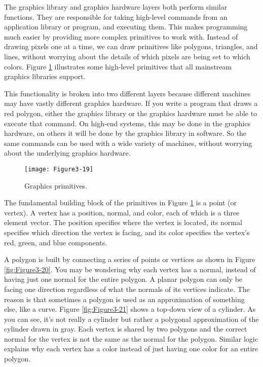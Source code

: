 The graphics library and graphics hardware layers both perform similar functions. They are responsible for taking high-level commands from an application library or program, and executing them. This makes programming much easier by providing more complex primitives to work with. Instead of drawing pixels one at a time, we can draw primitives like polygons, triangles, and lines, without worrying about the details of which pixels are being set to which colors. Figure \ref{fig:Figure3-19} illustrates some high-level primitives that all mainstream graphics libraries support.

This functionality is broken into two different layers because different machines may have vastly different graphics hardware. If you write a program that draws a red polygon, either the graphics library or the graphics hardware must be able to execute that command. On high-end systems, this may be done in the graphics hardware, on others it will be done by the graphics library in software. So the same commands can be used with a wide variety of machines, without worrying about the underlying graphics hardware.

\begin{figure}[!htb]
  \centering
  \texttt{[image: Figure3-19]}\\
  \caption{Graphics primitives.}\label{fig:Figure3-19}
\end{figure}

The fundamental building block of the primitives in Figure \ref{fig:Figure3-19} is a point (or vertex). A vertex has a position, normal, and color, each of which is a three element vector. The position specifies where the vertex is located, its normal specifies which direction the vertex is facing, and its color specifies the vertex's red, green, and blue components.

A polygon is built by connecting a series of points or vertices as shown in Figure \ref{fig:Figure3-20}. You may be wondering why each vertex has a normal, instead of having just one normal for the entire polygon. A planar polygon can only be facing one direction regardless of what the normals of its vertices indicate. The reason is that sometimes a polygon is used as an approximation of something else, like a curve. Figure \ref{fig:Figure3-21} shows a top-down view of a cylinder. As you can see, it's not really a cylinder but rather a polygonal approximation of the cylinder drawn in gray. Each vertex is shared by two polygons and the correct normal for the vertex is not the same as the normal for the polygon. Similar logic explains why each vertex has a color instead of just having one color for an entire polygon.

